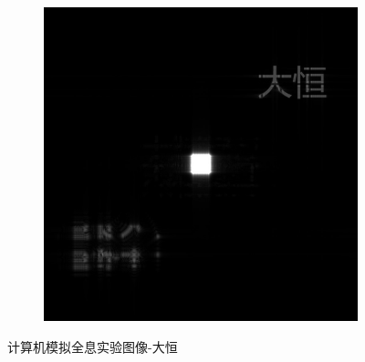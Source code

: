\documentclass{ctexart}
\begin{document}
\begin{figure}[H]
\begin{subfigure}{.32\textwidth}
  \end{subfigure}
  \begin{subfigure}{.32\textwidth}
    \includegraphics[width=\linewidth]{数字全息实验数据/计算机模拟全息/用软件重建的结果图像/1-大恒-重建.jpg}
  \end{subfigure}
  \caption{计算机模拟全息实验图像-大恒}
\end{figure}
\end{document}
